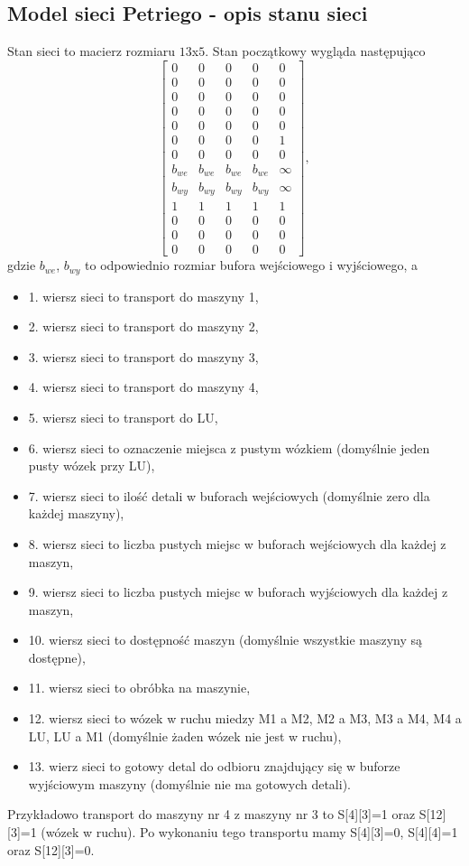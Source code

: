 \documentclass[10pt, a4paper]{article}
\begin{document}
\subsection{Model sieci Petriego - opis stanu sieci}
Stan sieci to macierz rozmiaru $13$x$ 5$. Stan początkowy wygląda następująco
\begin{equation}
\left[\begin{array}{ccccc}
0 & 0 & 0 & 0&0\\
0 &0 &0 &0&0\\
0 &0 &0 &0&0\\
0 &0 &0 &0&0\\
0 &0 &0 &0&0\\
0 &0 &0 &0 &1\\
0 &0 &0 &0&0\\
b_{we}&b_{we}&b_{we}&b_{we} & \infty\\
b_{wy}&b_{wy}&b_{wy}&b_{wy} & \infty\\
1&1&1&1 &1\\
0 &0 &0 &0 &0\\
0 &0 &0 &0 &0\\
0 &0 &0 &0 &0
\end{array}\right],
\end{equation}
gdzie $b_{we}$, $b_{wy}$ to odpowiednio rozmiar bufora wejściowego i wyjściowego, a
\begin{itemize}
\item 1. wiersz sieci to transport do maszyny 1,
\item 2. wiersz sieci to transport do maszyny 2,
\item 3. wiersz sieci to transport do maszyny 3,
\item 4. wiersz sieci to transport do maszyny 4,
\item 5. wiersz sieci to transport do LU,
\item 6. wiersz sieci to oznaczenie miejsca z pustym wózkiem (domyślnie jeden pusty wózek przy LU),
\item 7. wiersz sieci to ilość detali w buforach wejściowych (domyślnie zero dla każdej maszyny),
\item 8. wiersz sieci to liczba pustych miejsc w buforach wejściowych dla każdej z maszyn,
\item 9. wiersz sieci to liczba pustych miejsc w buforach wyjściowych dla każdej z maszyn,
\item 10. wiersz sieci to dostępność maszyn (domyślnie wszystkie maszyny są dostępne),
\item 11. wiersz sieci to obróbka na maszynie,
\item 12. wiersz sieci to wózek w ruchu miedzy M1 a M2, M2 a M3, M3 a M4, M4 a LU, LU a M1 (domyślnie żaden wózek nie jest w ruchu),
\item 13. wierz sieci to gotowy detal do odbioru znajdujący się w buforze wyjściowym maszyny (domyślnie nie ma gotowych detali).
\end{itemize}
Przykładowo transport do maszyny nr 4 z maszyny nr 3 to S[4][3]=1 oraz S[12][3]=1 (wózek w ruchu). Po wykonaniu tego transportu mamy S[4][3]=0, S[4][4]=1 oraz S[12][3]=0.
\end{document}
